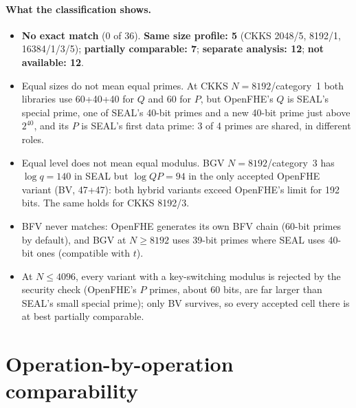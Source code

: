 \documentclass[11pt]{article}
\begin{document}
\paragraph{What the classification shows.}
\begin{itemize}[leftmargin=*, itemsep=2pt]
  \item \textbf{No exact match} (0 of 36). \textbf{Same size profile: 5} (CKKS 2048/5, 8192/1, 16384/1/3/5); \textbf{partially comparable: 7}; \textbf{separate analysis: 12}; \textbf{not available: 12}.
  \item Equal sizes do not mean equal primes. At CKKS $N{=}8192$/category~1 both libraries use 60+40+40 for $Q$ and 60 for $P$, but OpenFHE's $Q$ is SEAL's special prime, one of SEAL's 40-bit primes and a new 40-bit prime just above $2^{40}$, and its $P$ is SEAL's first data prime: 3 of 4 primes are shared, in different roles.
  \item Equal level does not mean equal modulus. BGV $N{=}8192$/category~3 has $\log q = 140$ in SEAL but $\log QP = 94$ in the only accepted OpenFHE variant (BV, 47+47): both hybrid variants exceed OpenFHE's limit for 192 bits. The same holds for CKKS 8192/3.
  \item BFV never matches: OpenFHE generates its own BFV chain (60-bit primes by default), and BGV at $N \ge 8192$ uses 39-bit primes where SEAL uses 40-bit ones (compatible with $t$).
  \item At $N \le 4096$, every variant with a key-switching modulus is rejected by the security check (OpenFHE's $P$ primes, about 60 bits, are far larger than SEAL's small special prime); only BV survives, so every accepted cell there is at best partially comparable.
\end{itemize}

\section{Operation-by-operation comparability}
\label{sec:ops}
\end{document}
